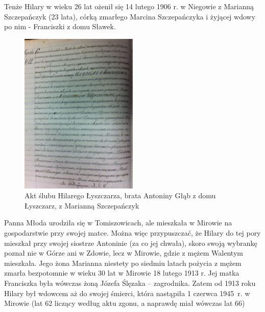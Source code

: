 Tenże Hilary w wieku 26 lat ożenił się 14 lutego 1906 r. w Niegowie z Marianną Szczepańczyk (23 lata), córką zmarłego Marcina Szczepańczyka i żyjącej wdowy po nim - Franciszki z domu Sławek.

\begin{figure}[!h]
\begin{center}
\includegraphics[width=0.5\textwidth]{zdjecia/akt_slubu_marianny_i_hilarego_lyszczarzow.jpg}
\caption[Akt ślubu Hilarego Łyszczarza z Marianną Szczepańczyk]{Akt ślubu Hilarego Łyszczarza, brata Antoniny Głąb z domu Łyszczarz, z Marianną Szczepańczyk}
\label{rys:akt_slubu_marianny_i_hilarego_lyszczarzow}
\end{center}
\end{figure}

Panna Młoda urodziła się w Tomiszowicach, ale mieszkała w Mirowie na gospodarstwie przy swojej matce. Można więc przypuszczać, że Hilary do tej pory mieszkał przy swojej siostrze Antoninie (za co jej chwała), skoro swoją wybrankę poznał nie w Górze ani w Zdowie, lecz w Mirowie, gdzie z mężem Walentym mieszkała. Jego żona Marianna niestety po siedmiu latach pożycia z mężem zmarła bezpotomnie w wieku 30 lat w Mirowie 18 lutego 1913 r. Jej matka Franciszka była wówczas żoną Józefa Ślęzaka -- zagrodnika. Zatem od 1913 roku Hilary był wdowcem aż do swojej śmierci, która nastąpiła 1 czerwca 1945~r. w Mirowie (lat 62 liczący według aktu zgonu, a naprawdę miał wówczas lat 66)

